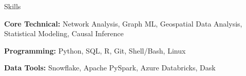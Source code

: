 
\begin{rSection}{Skills}
    \item \textbf{Core Technical:} Network Analysis, Graph ML, Geospatial Data Analysis, Statistical Modeling, Causal Inference 
    \item \textbf{Programming:} Python, SQL, R, Git, Shell/Bash, Linux
    \item \textbf{Data Tools:} Snowflake, Apache PySpark, Azure Databricks, Dask
\end{rSection}